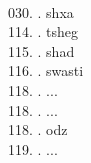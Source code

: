 \begin{tabbing}
\filler\tibsp{}\tenrm\ \tibetan
\egroup  \\
030. .	\> shxa	\> \bgroup\tibetan \def\u#1{\vtop{\baselineskip0pt\hbox{#1}\hbox{\tibsp\char123}}}\parindent=0pt \newbox\fillerbox\setbox\fillerbox\hbox{\vrule height0.4cm depth0.4cm width0pt}\def\filler{\copy\fillerbox}\tibsp{}\tibetan%
\filler\tibsp{}\tenrm\ \tibetan
\egroup   \\
114. .	\> tsheg  \> \bgroup\tibetan \def\u#1{\vtop{\baselineskip0pt\hbox{#1}\hbox{\tibsp\char123}}}\parindent=0pt \newbox\fillerbox\setbox\fillerbox\hbox{\vrule height0.4cm depth0.4cm width0pt}\def\filler{\copy\fillerbox}\tibsp{}\tibetan%
\filler\tenrm\ \tibetan
\egroup  \\
115. . 	\> shad \> \bgroup\tibetan \def\u#1{\vtop{\baselineskip0pt\hbox{#1}\hbox{\tibsp\char123}}}\parindent=0pt \newbox\fillerbox\setbox\fillerbox\hbox{\vrule height0.4cm depth0.4cm width0pt}\def\filler{\copy\fillerbox}\tibsp{}\tibetan\filler\tenrm\ \tibetan
\egroup  \\
116. .	\> swasti \> \bgroup\tibetan \def\u#1{\vtop{\baselineskip0pt\hbox{#1}\hbox{\tibsp\char123}}}\parindent=0pt \newbox\fillerbox\setbox\fillerbox\hbox{\vrule height0.4cm depth0.4cm width0pt}\def\filler{\copy\fillerbox}\tibsp{}\tibetan%
\filler\tenrm\ \tibetan
\egroup  \\
118. .  \> ...	\> \bgroup\tibetan \def\u#1{\vtop{\baselineskip0pt\hbox{#1}\hbox{\tibsp\char123}}}\parindent=0pt \newbox\fillerbox\setbox\fillerbox\hbox{\vrule height0.4cm depth0.4cm width0pt}\def\filler{\copy\fillerbox}\tibsp{}\tibetan{}%
\filler\tibsp{}\tenrm\ \tibetan
\egroup  \\
118. .  \> ...	\> \bgroup\tibetan \def\u#1{\vtop{\baselineskip0pt\hbox{#1}\hbox{\tibsp\char123}}}\parindent=0pt \newbox\fillerbox\setbox\fillerbox\hbox{\vrule height0.4cm depth0.4cm width0pt}\def\filler{\copy\fillerbox}\tibsp{}\tibetan{}%
\filler\tibsp{}\tenrm\ \tibetan
\egroup  \\
118. .  \> odz	\> \bgroup\tibetan \def\u#1{\vtop{\baselineskip0pt\hbox{#1}\hbox{\tibsp\char123}}}\parindent=0pt \newbox\fillerbox\setbox\fillerbox\hbox{\vrule height0.4cm depth0.4cm width0pt}\def\filler{\copy\fillerbox}\tibsp{}\tibetan{}%
\filler\tibsp{}\tenrm\ \tibetan
\egroup  \\
119. .  \> ...	\> \bgroup\tibetan \def\u#1{\vtop{\baselineskip0pt\hbox{#1}\hbox{\tibsp\char123}}}\parindent=0pt \newbox\fillerbox\setbox\fillerbox\hbox{\vrule height0.4cm depth0.4cm width0pt}\def\filler{\copy\fillerbox}\tibsp{}\tibetan{}%

\end{tabbing}
